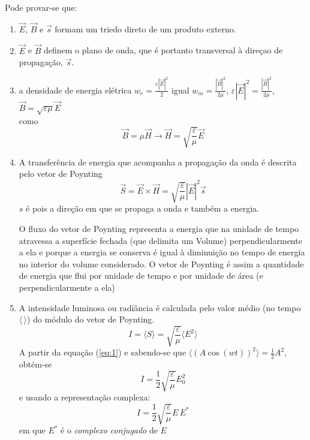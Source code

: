 \documentclass[a4paper,12pt]{article}
\begin{document}
Pode provar-se que: 
\begin{enumerate}
	\item $\vec{E}$, $\vec{B}$ e $\vec{s}$ formam um triedo direto de um produto externo.

	\item $\vec{E}$ e $\vec{B}$ definem o plano de onda, que é portanto transversal à direçao de propagação, $\vec{s}$.

	\item a densidade de energia elétrica $w_e= \frac{\varepsilon |\vec{E}|^2}{2}$ igual $w_m= \frac{ |\vec{B}|^2}{2\mu}$, $\varepsilon |\vec{E}|^2 = \frac{ |\vec{B}|^2}{2\mu}$, $\vec{B} = \sqrt{\varepsilon \mu} \vec{E}$ \\
	como 
	\begin{equation}
		\vec{B} = \mu \vec{H} \to \vec{H}= \sqrt{\frac{ \varepsilon}{\mu}} \vec{E} 
	\end{equation}

	\item A transferência de energia que acompanha a propagação da onda é descrita pelo vetor de Poynting 
	\begin{equation}
		\vec{S} = \vec{E} \times \vec{H} = \sqrt{\frac{ \varepsilon}{\mu}} |\vec{E}|^2 \vec{s} 
	\end{equation}
	$ s$ é pois a direção em que se propaga a onda e também a energia.
	
	O fluxo do vetor de Poynting representa a energia que na unidade de tempo atravessa a superfície fechada (que delimita um Volume) perpendicularmente a ela e porque a energia se conserva é igual à diminuição no tempo de energia no interior do volume considerado.
	O vetor de Poynting é assim a quantidade de energia que flui por unidade de tempo e por unidade de área (e perpendicularmente a ela) 
	 
	\item A intensidade luminosa ou radiância é calculada pelo valor médio (no tempo $\langle \, \rangle$) do módulo do vetor de Poynting. 
	\begin{equation}
		I = \langle S \rangle = \sqrt{\frac{ \varepsilon}{\mu}} \langle E^2 \rangle \label{eq:5} 
	\end{equation}
	A partir da equação (\ref{eq:1}) e sabendo-se que  $\langle (A \cos(wt) )^2  \rangle =\frac{1}{2} A^2$,  obtém-se 
	\begin{equation}
		\label{eq:6} I = \frac{1}{2}\sqrt{\frac{ \varepsilon}{\mu}} E_0^2 
	\end{equation}
	e usando a representação complexa: 
	\begin{equation}
		\label{eq:7} I = \frac{1}{2}\sqrt{\frac{ \varepsilon}{\mu}}  E\, E^* 
	\end{equation}
	em que $E^*$ é o \emph{complexo conjugado} de $E$
\end{enumerate}
\end{document}
